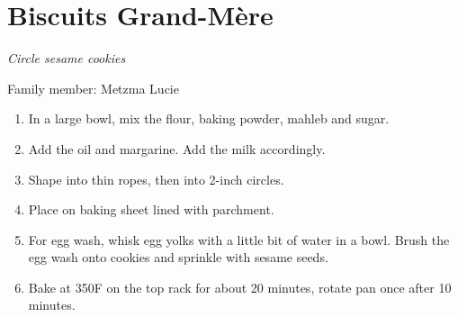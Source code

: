 \chapter{Biscuits Grand-Mère}
\label{ch:biscuits_grandmere}



\textit{Circle sesame cookies}

Family member: Metzma Lucie

\begin{enumerate}
    \item In a large bowl, mix the flour, baking powder, mahleb and sugar.
    \item Add the oil and margarine. Add the milk accordingly.
    \item Shape into thin ropes, then into 2-inch circles.
    \item Place on baking sheet lined with parchment.
    \item For egg wash, whisk egg yolks with a little bit of water in a bowl. Brush the egg wash onto cookies and sprinkle with sesame seeds.
    \item Bake at 350\degree F on the top rack for about 20 minutes, rotate pan once after 10 minutes.
\end{enumerate}


